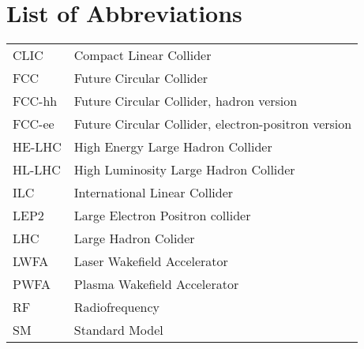 \chapter*{List of Abbreviations}

\begin{tabular}{l l}
CLIC    & Compact Linear Collider\\
FCC		& Future Circular Collider\\
FCC-hh  & Future Circular Collider, hadron version\\
FCC-ee  & Future Circular Collider, electron-positron version\\
HE-LHC  & High Energy Large Hadron Collider\\
HL-LHC  & High Luminosity Large Hadron Collider\\
ILC     & International Linear Collider\\
LEP2    & Large Electron Positron collider\\
LHC     & Large Hadron Colider\\
LWFA    & Laser Wakefield Accelerator\\
PWFA    & Plasma Wakefield Accelerator\\
RF      & Radiofrequency\\
SM		& Standard Model\\
\end{tabular}
